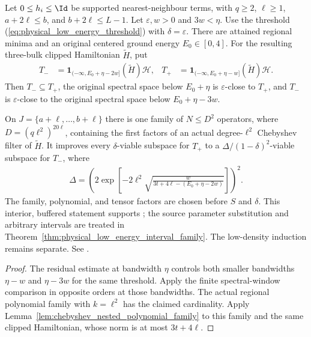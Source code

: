 \begin{lemma}
    \label{lem:physical_low_energy_filter_family}
    \leanok
    Let $0\le h_i\le\Id$ be supported nearest-neighbour terms, with
    $q\ge2$, $\ell\ge1$, $a+2\ell\le b$, and $b+2\ell\le L-1$.
    Let $\varepsilon,w>0$ and $3w<\eta$. Use the threshold
    (\ref{eq:physical_low_energy_threshold}) with $\delta=\varepsilon$.
    There are attained regional minima and an original centered ground
    energy $E_0\in[0,4]$. For the resulting three-bulk clipped Hamiltonian
    $\widetilde H$, put
    \begin{align*}
        T_- & =\mathbf1_{(-\infty,E_0+\eta-2w]}(\widetilde H)\mathcal H, &
        T_+ & =\mathbf1_{(-\infty,E_0+\eta-w]}(\widetilde H)\mathcal H.
    \end{align*}
    Then $T_-\subseteq T_+$, the original spectral space below $E_0+\eta$
    is $\varepsilon$-close to $T_+$, and $T_-$ is $\varepsilon$-close to
    the original spectral space below $E_0+\eta-3w$.

    On $J=\{a+\ell,\ldots,b+\ell\}$ there is one family of $N\le D^2$
    operators, where $D=(q\ell^2)^{20\ell}$, containing the first factors
    of an actual degree-$\ell^2$ Chebyshev filter of $\widetilde H$.
    It improves every $\delta$-viable subspace for $T_+$ to a
    $\Delta/(1-\delta)^2$-viable subspace for $T_-$, where
    \begin{align*}
        \Delta=\left(2\exp\left[-2\ell^2
            \sqrt{\frac{w}{3t+4\ell-(E_0+\eta-2w)}}\right]\right)^2.
    \end{align*}
    The family, polynomial, and tensor factors are chosen before $S$ and
    $\delta$. This interior, buffered statement supports
    \cite[Theorem~4.8]{Arad2016RigorousRG}; the source parameter substitution and arbitrary intervals are treated
    in Theorem~\ref{thm:physical_low_energy_interval_family}. The low-density
    induction remains separate. See \cite{gap:alvv16_low_energy_family_buffers}.
\end{lemma}

\begin{proof}\leanok
    The residual estimate at bandwidth $\eta$ controls both smaller
    bandwidths $\eta-w$ and $\eta-3w$ for the same threshold.
    Apply the finite spectral-window comparison in opposite orders at
    those bandwidths. The actual regional polynomial family with
    $k=\ell^2$ has the claimed cardinality. Apply Lemma~\ref{lem:chebyshev_nested_polynomial_family}
    to this family and the same clipped Hamiltonian, whose norm is at
    most $3t+4\ell$.
\end{proof}

